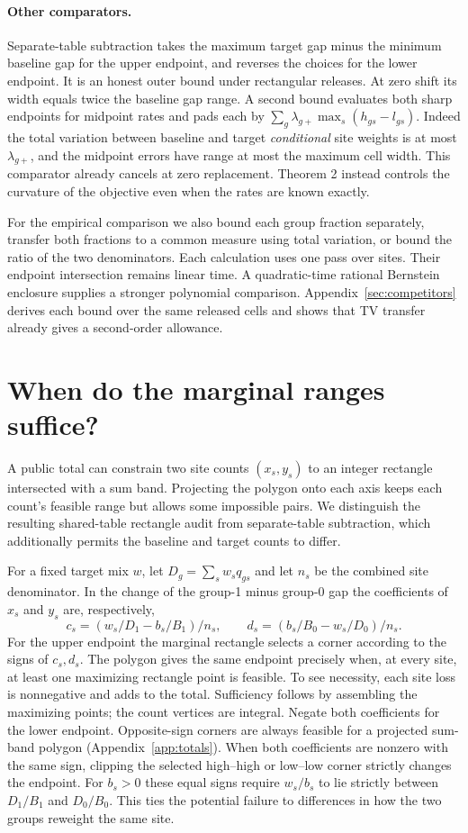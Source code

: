 \documentclass[11pt]{article}
\begin{document}
\paragraph{Other comparators.}
Separate-table subtraction takes the maximum target gap minus the minimum baseline gap for the upper endpoint, and reverses the choices for the lower endpoint. It is an honest outer bound under rectangular releases. At zero shift its width equals twice the baseline gap range. A second bound evaluates both sharp endpoints for midpoint rates and pads each by $\sum_g\lambda_{g+}\max_s(h_{gs}-l_{gs})$. Indeed the total variation between baseline and target \emph{conditional} site weights is at most $\lambda_{g+}$, and the midpoint errors have range at most the maximum cell width. This comparator already cancels at zero replacement. Theorem 2 instead controls the curvature of the objective even when the rates are known exactly.


For the empirical comparison we also bound each group fraction separately, transfer both fractions to a common measure using total variation, or bound the ratio of the two denominators. Each calculation uses one pass over sites. Their endpoint intersection remains linear time. A quadratic-time rational Bernstein enclosure supplies a stronger polynomial comparison. Appendix~\ref{sec:competitors} derives each bound over the same released cells and shows that TV transfer already gives a second-order allowance.

\section{When do the marginal ranges suffice?}
A public total can constrain two site counts $(x_s,y_s)$ to an integer rectangle intersected with a sum band. Projecting the polygon onto each axis keeps each count's feasible range but allows some impossible pairs. We distinguish the resulting shared-table rectangle audit from separate-table subtraction, which additionally permits the baseline and target counts to differ.

For a fixed target mix $w$, let $D_g=\sum_s w_sq_{gs}$ and let $n_s$ be the combined site denominator. In the change of the group-1 minus group-0 gap the coefficients of $x_s$ and $y_s$ are, respectively,
\[
 c_s=(w_s/D_1-b_s/B_1)/n_s,\qquad
 d_s=(b_s/B_0-w_s/D_0)/n_s .
\]
For the upper endpoint the marginal rectangle selects a corner according to the signs of $c_s,d_s$. The polygon gives the same endpoint precisely when, at every site, at least one maximizing rectangle point is feasible. To see necessity, each site loss is nonnegative and adds to the total. Sufficiency follows by assembling the maximizing points; the count vertices are integral. Negate both coefficients for the lower endpoint. Opposite-sign corners are always feasible for a projected sum-band polygon (Appendix~\ref{app:totals}). When both coefficients are nonzero with the same sign, clipping the selected high--high or low--low corner strictly changes the endpoint. For $b_s>0$ these equal signs require $w_s/b_s$ to lie strictly between $D_1/B_1$ and $D_0/B_0$. This ties the potential failure to differences in how the two groups reweight the same site.
\end{document}

